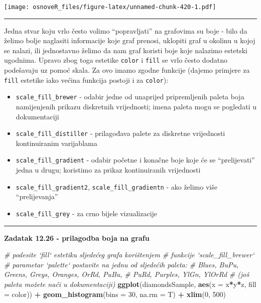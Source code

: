\documentclass[]{book}
\newenvironment{Shaded}{\begin{snugshade}}{\end{snugshade}}
\newcommand{\KeywordTok}[1]{\textcolor[rgb]{0.13,0.29,0.53}{\textbf{#1}}}
\newcommand{\DataTypeTok}[1]{\textcolor[rgb]{0.13,0.29,0.53}{#1}}
\newcommand{\DecValTok}[1]{\textcolor[rgb]{0.00,0.00,0.81}{#1}}
\newcommand{\StringTok}[1]{\textcolor[rgb]{0.31,0.60,0.02}{#1}}
\newcommand{\CommentTok}[1]{\textcolor[rgb]{0.56,0.35,0.01}{\textit{#1}}}
\newcommand{\OperatorTok}[1]{\textcolor[rgb]{0.81,0.36,0.00}{\textbf{#1}}}
\newcommand{\NormalTok}[1]{#1}
\providecommand{\tightlist}{%
  \setlength{\itemsep}{0pt}\setlength{\parskip}{0pt}}
\theoremstyle{definition}
\theoremstyle{definition}
\theoremstyle{definition}
\theoremstyle{remark}
\begin{document}
\texttt{[image: osnoveR\_files/figure-latex/unnamed-chunk-420-1.pdf]}

\begin{center}\rule{0.5\linewidth}{\linethickness}\end{center}

Jedna stvar koju vrlo često volimo ``popravljati'' na grafovima su boje
- bilo da želimo bolje naglasiti informacije koje graf prenosi, uklopiti
graf u okolinu u kojoj se nalazi, ili jednostavno želimo da nam graf
koristi boje koje nalazimo estetski ugodnima. Upravo zbog toga estetike
\texttt{color} i \texttt{fill} se vrlo često dodatno podešavaju uz pomoć
skala. Za ovo imamo zgodne funkcije (dajemo primjere za \texttt{fill}
estetike iako većina funkcija postoji i za \texttt{color}):

\begin{itemize}
\tightlist
\item
  \texttt{scale\_fill\_brewer} - odabir jedne od unaprijed pripremljenih
  paleta boja namijenjenih prikazu diskretnih vrijednosti; imena paleta
  mogu se pogledati u dokumentaciji
\item
  \texttt{scale\_fill\_distiller} - prilagođava palete za diskretne
  vrijednosti kontinuiranim varijablama
\item
  \texttt{scale\_fill\_gradient} - odabir početne i konačne boje koje će
  se ``prelijevati'' jedna u drugu; koristimo za prikaz kontinuiranih
  vrijednosti
\item
  \texttt{scale\_fill\_gradient2}, \texttt{scale\_fill\_gradientn} - ako
  želimo više ``prelijevanja''
\item
  \texttt{scale\_fill\_grey} - za crno bijele vizualizacije
\end{itemize}

\begin{center}\rule{0.5\linewidth}{\linethickness}\end{center}

\textbf{Zadatak 12.26 - prilagodba boja na grafu}

\begin{Shaded}
\begin{Highlighting}[]
\CommentTok{# podesite `fill` estetiku sljedećeg grafa korištenjem }
\CommentTok{# funkcije `scale_fill_brewer`}
\CommentTok{# parametar `palette` postavite na jednu od sljedećih paleta:}
\CommentTok{# Blues, BuPu, Greens, Greys, Oranges, OrRd, PuBu, }
\CommentTok{#     PuRd, Purples, YlGn, YlOrRd}
\CommentTok{# (još paleta možete naći u dokumentaciji)}
\KeywordTok{ggplot}\NormalTok{(diamondsSample, }\KeywordTok{aes}\NormalTok{(}\DataTypeTok{x =}\NormalTok{ x}\OperatorTok{*}\NormalTok{y}\OperatorTok{*}\NormalTok{z, }\DataTypeTok{fill =}\NormalTok{ color)) }\OperatorTok{+}\StringTok{ }
\StringTok{  }\KeywordTok{geom_histogram}\NormalTok{(}\DataTypeTok{bins =} \DecValTok{30}\NormalTok{, }\DataTypeTok{na.rm =}\NormalTok{ T) }\OperatorTok{+}\StringTok{ }
\StringTok{  }\KeywordTok{xlim}\NormalTok{(}\DecValTok{0}\NormalTok{, }\DecValTok{500}\NormalTok{)}
\end{Highlighting}
\end{Shaded}
\end{document}
